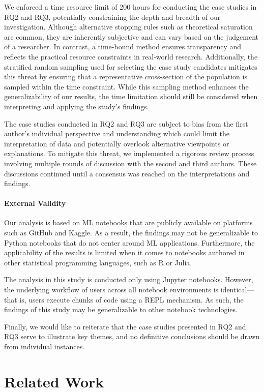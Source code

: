 \documentclass[journal]{IEEEtran}       %
\begin{document}
We enforced a time resource limit of 200 hours for conducting the
case studies in RQ2 and RQ3, potentially constraining the depth and
breadth of our investigation. Although alternative stopping rules
such as theoretical saturation are common, they are inherently
subjective and can vary based on the judgement of a researcher. In
contrast, a time-bound method ensures transparency and reflects the
practical resource constraints in real-world research. Additionally,
the stratified random sampling used for selecting the case study
candidates mitigates this threat by ensuring that a representative
cross-section of the population is sampled within the time
constraint. While this sampling method enhances the generalizability
of our results, the time limitation should still be considered when
interpreting and applying the study's findings.

The case studies conducted in RQ2 and RQ3 are subject to bias from
the first author's individual perspective and understanding which
could limit the interpretation of data and potentially overlook
alternative viewpoints or explanations. To mitigate this threat, we
implemented a rigorous review process involving multiple rounds of
discussion with the second and third authors. These discussions
continued until a consensus was reached on the interpretations and findings.

\paragraph{\textbf{External Validity}} Our analysis is based on ML
notebooks that are publicly available on platforms such as GitHub and
Kaggle. As a result, the findings may not be generalizable to Python
notebooks that do not center around ML applications. Furthermore, the
applicability of the results is limited when it comes to notebooks
authored in other statistical programming languages, such as R or Julia.

The analysis in this study is conducted only using Jupyter notebooks.
However, the underlying workflow of users across all notebook
environments is identical---that is, users execute chunks of code
using a REPL mechanism. As such, the findings of this study may be
generalizable to other notebook technologies.

Finally, we would like to reiterate that the case studies presented
in RQ2 and RQ3 serve to illustrate key themes, and no definitive
conclusions should be drawn from individual instances.
\section{Related Work}\label{sec:related}
\end{document}

